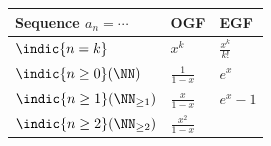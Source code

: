 \begin{longtable}[]{@{}lll@{}}
\toprule
\begin{minipage}[b]{0.30\columnwidth}\raggedright
Sequence \(a_n = \cdots\)\strut
\end{minipage} & \begin{minipage}[b]{0.30\columnwidth}\raggedright
OGF\strut
\end{minipage} & \begin{minipage}[b]{0.30\columnwidth}\raggedright
EGF\strut
\end{minipage}\tabularnewline
\midrule
\endhead
\begin{minipage}[t]{0.30\columnwidth}\raggedright
\(\indic{n=k}\)\strut
\end{minipage} & \begin{minipage}[t]{0.30\columnwidth}\raggedright
\(x^k\)\strut
\end{minipage} & \begin{minipage}[t]{0.30\columnwidth}\raggedright
\(\frac{x^k}{k!}\)\strut
\end{minipage}\tabularnewline
\begin{minipage}[t]{0.30\columnwidth}\raggedright
\(\indic{n \geq 0} (\NN)\)\strut
\end{minipage} & \begin{minipage}[t]{0.30\columnwidth}\raggedright
\(\frac 1 {1-x}\)\strut
\end{minipage} & \begin{minipage}[t]{0.30\columnwidth}\raggedright
\(e^x\)\strut
\end{minipage}\tabularnewline
\begin{minipage}[t]{0.30\columnwidth}\raggedright
\(\indic{n \geq 1} (\NN_{\geq 1})\)\strut
\end{minipage} & \begin{minipage}[t]{0.30\columnwidth}\raggedright
\(\frac x {1-x}\)\strut
\end{minipage} & \begin{minipage}[t]{0.30\columnwidth}\raggedright
\(e^x - 1\)\strut
\end{minipage}\tabularnewline
\begin{minipage}[t]{0.30\columnwidth}\raggedright
\(\indic{n \geq 2} (\NN_{\geq 2})\)\strut
\end{minipage} & \begin{minipage}[t]{0.30\columnwidth}\raggedright
\(\frac {x^2} {1-x}\)\strut
\end{minipage} & \begin{minipage}[t]{0.30\columnwidth}\raggedright

\end{minipage}
\end{longtable}
